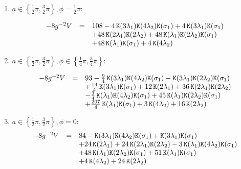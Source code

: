 \documentclass[a4paper,12pt]{article}
\begin{document}
\begin{enumerate}

\item $a\in\left\{\frac{1}{2}\pi, \frac{3}{2}\pi\right\}, \phi=\frac{1}{2}\pi$:

\begin{equation}
\begin{array}{lll}
-8g^{-2}V&=&108
-4\,{\tt K}{\left(3 \lambda_1\right)} {\tt K}{\left(4 \lambda_2\right)} {\tt K}{\left( \sigma_1\right)}
+4\,{\tt K}{\left(3 \lambda_1\right)} {\tt K}{\left( \sigma_1\right)}\\
&&+48\,{\tt K}{\left(2 \lambda_1\right)} {\tt K}{\left(2 \lambda_2\right)}
+48\,{\tt K}{\left( \lambda_1\right)} {\tt K}{\left(2 \lambda_2\right)} {\tt K}{\left( \sigma_1\right)}\\
&&+48\,{\tt K}{\left( \lambda_1\right)} {\tt K}{\left( \sigma_1\right)}
+4\,{\tt K}{\left(4 \lambda_2\right)}
\end{array}
\end{equation}

\vfill\break


\item $a\in\left\{\frac{1}{2}\pi, \frac{3}{2}\pi\right\}, \phi\in\left\{\frac{1}{4}\pi, \frac{3}{4}\pi\right\}$:

\begin{equation}
\begin{array}{lll}
-8g^{-2}V&=&93
-\frac{9}{4}\,{\tt K}{\left(3 \lambda_1\right)} {\tt K}{\left(4 \lambda_2\right)} {\tt K}{\left( \sigma_1\right)}
-{\tt K}{\left(3 \lambda_1\right)} {\tt K}{\left(2 \lambda_2\right)} {\tt K}{\left( \sigma_1\right)}\\
&&+\frac{13}{4}\,{\tt K}{\left(3 \lambda_1\right)} {\tt K}{\left( \sigma_1\right)}
+12\,{\tt K}{\left(2 \lambda_1\right)}
+36\,{\tt K}{\left(2 \lambda_1\right)} {\tt K}{\left(2 \lambda_2\right)}\\
&&-\frac{3}{4}\,{\tt K}{\left( \lambda_1\right)} {\tt K}{\left(4 \lambda_2\right)} {\tt K}{\left( \sigma_1\right)}
+45\,{\tt K}{\left( \lambda_1\right)} {\tt K}{\left(2 \lambda_2\right)} {\tt K}{\left( \sigma_1\right)}\\
&&+\frac{207}{4}\,{\tt K}{\left( \lambda_1\right)} {\tt K}{\left( \sigma_1\right)}
+3\,{\tt K}{\left(4 \lambda_2\right)}
+16\,{\tt K}{\left(2 \lambda_2\right)}
\end{array}
\end{equation}


\item $a\in\left\{\frac{1}{2}\pi, \frac{3}{2}\pi\right\}, \phi=0$:
\begin{equation}
\begin{array}{lll}
-8g^{-2}V&=&84
-{\tt K}{\left(3 \lambda_1\right)} {\tt K}{\left(4 \lambda_2\right)} {\tt K}{\left( \sigma_1\right)}
+{\tt K}{\left(3 \lambda_1\right)} {\tt K}{\left( \sigma_1\right)}\\
&&+24\,{\tt K}{\left(2 \lambda_1\right)}
+24\,{\tt K}{\left(2 \lambda_1\right)} {\tt K}{\left(2 \lambda_2\right)}
-3\,{\tt K}{\left( \lambda_1\right)} {\tt K}{\left(4 \lambda_2\right)} {\tt K}{\left( \sigma_1\right)}\\
&&+48\,{\tt K}{\left( \lambda_1\right)} {\tt K}{\left(2 \lambda_2\right)} {\tt K}{\left( \sigma_1\right)}
+51\,{\tt K}{\left( \lambda_1\right)} {\tt K}{\left( \sigma_1\right)}\\
&&+4\,{\tt K}{\left(4 \lambda_2\right)}
+24\,{\tt K}{\left(2 \lambda_2\right)}
\end{array}
\end{equation}
\end{enumerate}
\end{document}
